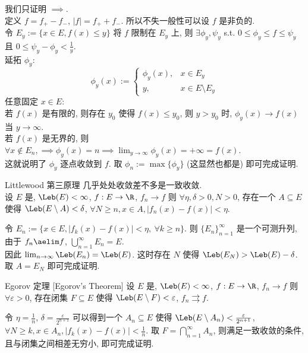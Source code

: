 \begin{prf}
    我们只证明 $\implies$. \\
    定义 \(f=f_+-f_-\), \(|f|=f_++f_-\). 所以不失一般性可以设 \(f\) 是非负的.\\
    令 \(E_y:=\{x\in E, f(x)\leq y\}\) 将 \(f\) 限制在 \(E_y\) 上, 则 \(\exists \phi_y,\psi_y\) s.t. \(0\leq\phi_y \leq f \leq \psi_y\) 且 \(0\leq \psi_y-\phi_y<\frac{1}{y}\).\\
    延拓 \(\phi_y\): 
    \[\phi_y(x):=\begin{cases}
    \phi_y(x), & x\in E_y\\
    y, & x\in E\setminus E_y
    \end{cases}\]
    任意固定 \(x\in E\):\\
    若 \(f(x)\) 是有限的, 则存在 \(y_0\) 使得 \(f(x)\leq y_0\), 则 \(y>y_0\) 时, \(\phi_y(x)\to f(x)\) 当 \(y\to\infty\).\\
    若 \(f(x)\) 是无界的, 则 \(\forall x\notin E_n, \implies \phi_y(x)=n\implies \lim_{y\to\infty}\phi_y(x)=+\infty=f(x)\).\\
    这就说明了 \(\phi_y\) 逐点收敛到 \(f\). 取 \(\phi_n:=\max\{\phi_y\}\) (这显然也都是\SimpleFunc{}) 即可完成证明.
\end{prf}
\begin{thm}
    {Littlewood 第三原理}
    几乎处处收敛差不多是一致收敛.\\
    设 \(E\) 是\MeasurableSet{}, \(\Leb(E)<\infty\), \(f:E\to\R\), \(f_n\to f\) 则 \(\forall\eta,\delta>0, N>0\), 存在一个\MeasurableSet{} \(A\subseteq E\) 
    使得 \(\Leb(E\setminus A)<\delta\), \(\forall N\geq n,x\in A, |f_n(x)-f(x)|<\eta\). 
\end{thm}
\begin{prf}
    令 \(E_n:=\{x\in E, |f_k(x)-f(x)|<\eta,\ \forall k\geq n\}\). 则 \(\{E_n\}_{n=1}^\infty\) 是一个可测升列, 由于 \(f_n\aelim f\), \(\bigcup_{n=1}^\infty E_n=E\). \\
    因此 \(\lim_{n\to\infty} \Leb(E_n)=\Leb(E)\). 这时存在 \(N\) 使得 \(\Leb(E_{N})>\Leb(E)-\delta\). 取 \(A=E_{N}\) 即可完成证明.
\end{prf}
\begin{thm}
    [egorov]
    {Egorov 定理}
    [Egorov's Theorem]
    设 \(E\) 是\MeasurableSet{}, \(\Leb(E)<\infty\), \(f:E\to\R\), \(f_n\to f\) 则 \(\forall\varepsilon>0\), 存在闭集 \(F\subseteq E\) 使得 \(\Leb(E\setminus F)<\varepsilon\), \(f_n\rightrightarrows f\).
\end{thm}
\begin{prf}
    令 \(\eta=\frac{1}{n}\), \(\delta=\frac{\varepsilon}{2^{n+1}}\) 可以得到一个\MeasurableSet{} \(A_n\subseteq E\) 使得 \(\Leb(E\setminus A_n)<\frac{\varepsilon}{2^{n+1}}\), \(\forall N\geq k,x\in A_n, |f_k(x)-f(x)|<\frac{1}{n}\). 取 \(F=\bigcap_{n=1}^\infty A_n\), 则满足一致收敛的条件, 且\MeasurableSet{}与闭集之间相差无穷小, 即可完成证明.
\end{prf}
